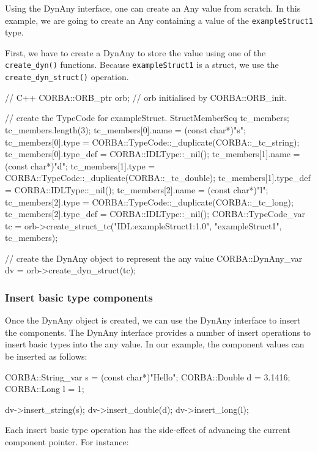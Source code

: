 \documentclass[11pt,twoside,a4paper]{book}
\newcommand{\type}[1]{\texttt{#1}}
\newcommand{\op}[1]{\texttt{#1()}}
\newcommand{\dsc}{\discretionary{}{}{}}
\begin{document}
Using the DynAny interface, one can create an Any value from scratch.
In this example, we are going to create an Any containing a value of
the \type{exampleStruct1} type.

First, we have to create a DynAny to store the value using one of the
\op{create\_\dsc{}dyn} functions. Because \type{exampleStruct1} is a
struct, we use the \op{create\_\dsc{}dyn\_\dsc{}struct} operation.

\begin{cxxlisting}
// C++
CORBA::ORB_ptr orb;  // orb initialised by CORBA::ORB_init.

// create the TypeCode for exampleStruct.
StructMemberSeq tc_members;
tc_members.length(3);
tc_members[0].name = (const char*)"s";
tc_members[0].type = CORBA::TypeCode::_duplicate(CORBA::_tc_string);
tc_members[0].type_def = CORBA::IDLType::_nil();
tc_members[1].name = (const char*)"d";
tc_members[1].type = CORBA::TypeCode::_duplicate(CORBA::_tc_double);
tc_members[1].type_def = CORBA::IDLType::_nil();
tc_members[2].name = (const char*)"l";
tc_members[2].type = CORBA::TypeCode::_duplicate(CORBA::_tc_long);
tc_members[2].type_def = CORBA::IDLType::_nil();
CORBA::TypeCode_var tc = orb->create_struct_tc("IDL:exampleStruct1:1.0",
                                               "exampleStruct1",
                                               tc_members);

// create the DynAny object to represent the any value
CORBA::DynAny_var dv = orb->create_dyn_struct(tc);
\end{cxxlisting}


\subsubsection{Insert basic type components}

Once the DynAny object is created, we can use the DynAny interface to
insert the components. The DynAny interface provides a number of
insert operations to insert basic types into the any value. In our
example, the component values can be inserted as follows:

\begin{cxxlisting}
CORBA::String_var s = (const char*)"Hello";
CORBA::Double     d = 3.1416;
CORBA::Long       l = 1;

dv->insert_string(s);
dv->insert_double(d);
dv->insert_long(l);
\end{cxxlisting}

Each insert basic type operation has the side-effect of advancing the
current component pointer. For instance:
\end{document}
